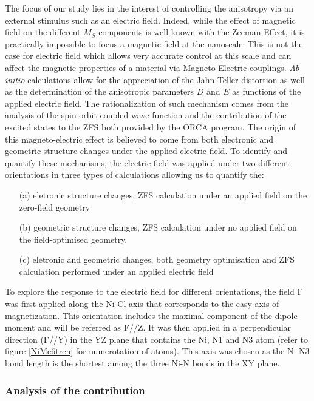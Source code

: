 \documentclass[10pt]{report}
\numberwithin{equation}{section}
\begin{document}
\par The focus of our study lies in the interest of controlling the anisotropy via an external stimulus such as an electric field.
Indeed, while the effect of magnetic field on the different $M_S$ components is well known with the Zeeman Effect, it is practically impossible to focus a magnetic field at the nanoscale.
This is not the case for electric field which allows very accurate control at this scale and can affect the magnetic properties of a material via Magneto-Electric couplings.
\textit{Ab} \textit{initio} calculations allow for the appreciation of the Jahn-Teller distortion as well as the determination of the anisotropic parameters $D$ and $E$ as functions of the applied electric field.
The rationalization of such mechanism comes from the analysis of the spin-orbit coupled wave-function and the contribution of the excited states to the ZFS both provided by the ORCA program.
The  origin of this magneto-electric effect is believed to come from both electronic and geometric structure changes under the applied electric field. 
To identify and quantify these mechanisms, the electric field was applied under two different orientations in three types of calculations allowing us to quantify the:

\begin{itemize}
    \item[(a)] eletronic structure changes, ZFS calculation under an applied field on the zero-field geometry
    \item[(b)] geometric structure changes, ZFS calculation under no applied field on the field-optimised geometry.
    \item[(c)] eletronic and geometric changes, both geometry optimisation and ZFS calculation performed under an applied electric field
\end{itemize}

To explore the response to the electric field for different orientations, the field F was first applied along the Ni-Cl axis that corresponds to the easy axis of magnetization.
This orientation includes the maximal component of the dipole moment and will be referred as F//Z.
It was then applied in a perpendicular direction (F//Y) in the YZ plane that contains the Ni, N1 and N3 atom (refer to figure \ref{NiMe6tren} for numerotation of atoms). 
This axis was chosen as the Ni-N3 bond length is the shortest among the three Ni-N bonds in the XY plane.

\subsubsection*{Analysis of the contribution}
\end{document}
